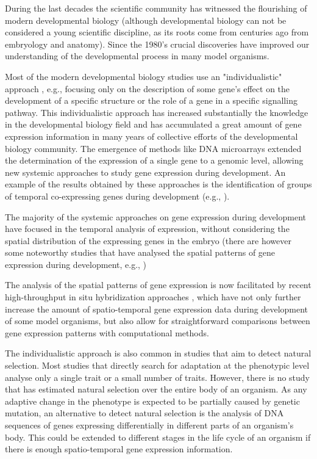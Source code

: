 
During the last decades the scientific community has witnessed the flourishing of modern developmental biology (although developmental biology can not be considered a young scientific discipline, as its roots come from centuries ago from embryology and anatomy). Since the 1980's crucial discoveries \citep{Gilbert1998} have improved our understanding of the developmental process in many model organisms.

Most of the modern developmental biology studies use an "individualistic" approach \citep{Davidson2009}, e.g., focusing only on the description of some gene's effect on the development of a specific structure or the role of a gene in a specific signalling pathway.
%
This individualistic approach has increased substantially the knowledge in the developmental biology field and has accumulated a great amount of gene expression information in many years of collective efforts of the developmental biology community.
The emergence of methods like DNA microarrays extended the determination of the expression of a single gene to a genomic level, allowing new systemic approaches to study gene expression during development. An example of the results obtained by these approaches is the identification of groups of temporal co-expressing genes during development (e.g., \citealp{Arbeitman2002,Hooper2007}).

The majority of the systemic approaches on gene expression during development have focused in the temporal analysis of expression, without considering the spatial distribution of the expressing genes in the embryo (there are however some noteworthy studies that have analysed the spatial patterns of gene expression during development, e.g., \citealp{Gurunathan2004,Tomancak2007,Frise2010,Crombach2012,Konikoff2012} )

The analysis of the spatial patterns of gene expression is now facilitated by recent high-throughput in situ hybridization approaches \citep{Tomancak2002,Pollet2003,Imai2004,Christiansen2006,Lecuyer2007,Tassy2010}, which have not only further increase the amount of spatio-temporal gene expression data during development of some model organisms, but also allow for straightforward comparisons between gene expression patterns with computational methods.

The individualistic approach is also common in studies that aim to detect natural selection. Most studies that directly search for adaptation at the phenotypic level analyse only a single trait or a small number of traits. However, there is no study that has estimated natural selection over the entire body of an organism.
As any adaptive change in the phenotype is expected to be partially caused by genetic mutation, an alternative to detect natural selection is the analysis of DNA sequences of genes expressing differentially in different parts of an organism's body. This could be extended to different stages in the life cycle of an organism if there is enough spatio-temporal gene expression information.

